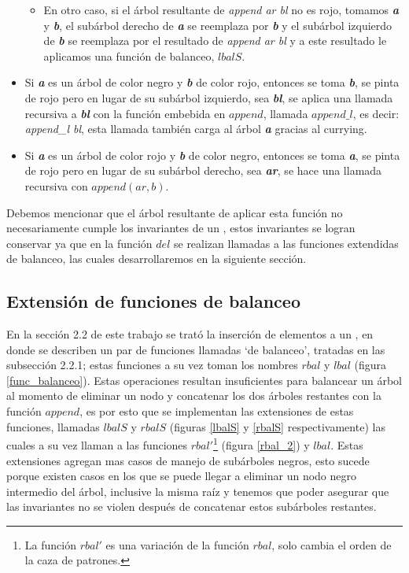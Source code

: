 \begin{itemize}
\begin{itemize}
      \item En otro caso, si el \'arbol resultante de \textit{append ar bl} no es rojo, tomamos 
      \textbf{\textit{a}} y \textbf{\textit{b}}, el subárbol derecho de \textbf{\textit{a}} se 
      reemplaza por \textbf{\textit{b}} y el subárbol izquierdo de \textbf{\textit{b}} se reemplaza 
      por el resultado de \textit{append ar bl} y a este resultado le aplicamos una función de 
      balanceo, $lbalS$.
    \end{itemize}
    \item Si \textbf{\textit{a}} es un \'arbol de color negro y \textbf{\textit{b}} de color rojo,
    entonces se toma \textbf{\textit{b}}, se pinta de rojo pero en lugar de su subárbol izquierdo, 
    sea \textbf{\textit{bl}}, se aplica una llamada recursiva a \textbf{\textit{bl}} con la 
    funci\'on embebida en $append$, llamada $append\_l$, es decir: \textit{append\_l bl}, esta 
    llamada tambi\'en carga al \'arbol \textbf{\textit{a}} gracias al currying\cite{Currying}.
    \item Si \textbf{\textit{a}} es un \'arbol de color rojo y \textbf{\textit{b}} de color negro,
    entonces se toma \textbf{\textit{a}}, se pinta de rojo pero en lugar de su subárbol derecho, sea
    \textbf{\textit{ar}}, se hace una llamada recursiva con $append(ar,b)$.
\end{itemize}

Debemos mencionar que el \'arbol resultante de aplicar esta funci\'on no necesariamente cumple los
invariantes de un {\arn}, estos invariantes se logran conservar ya que en la funci\'on $del$ se
realizan llamadas a las funciones extendidas de balanceo, las cuales desarrollaremos en la
siguiente sección.

\subsection{Extensi\'on de funciones de balanceo}

En la secci\'on 2.2 de este trabajo se trat\'o la inserci\'on de elementos a un {\arn}, en donde se
describen un par de funciones llamadas `de balanceo', tratadas en las subsecci\'on
2.2.1; estas funciones a su vez toman los nombres $rbal$ y $lbal$ (figura \ref{func_balanceo}).
Estas operaciones resultan insuficientes para balancear un \'arbol al momento de eliminar un nodo y
concatenar los dos \'arboles restantes con la función $append$, es por esto que se implementan las
extensiones de estas funciones, llamadas $lbalS$ y $rbalS$ (figuras \ref{lbalS} y \ref{rbalS}
respectivamente) las cuales a su vez llaman a las funciones $rbal'$\footnote{La funci\'on $rbal'$
es una variación de la función $rbal$, solo cambia el orden de la caza de patrones.} (figura
\ref{rbal_2}) y $lbal$. Estas extensiones agregan mas casos de manejo de subárboles negros, esto
sucede porque existen casos en los que se puede llegar a eliminar un nodo negro intermedio del \'arbol,
inclusive la misma ra\'iz y tenemos que poder asegurar que las invariantes no se violen después 
de concatenar estos subárboles restantes.

